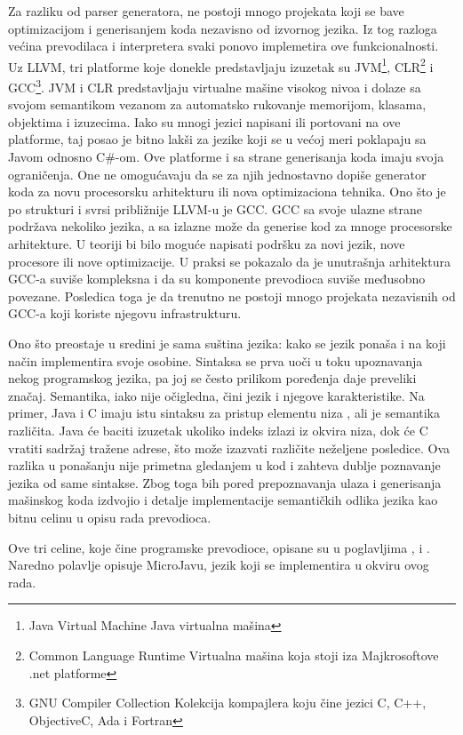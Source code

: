 Za razliku od parser generatora, ne postoji mnogo projekata koji se bave optimizacijom i generisanjem koda nezavisno od izvornog jezika.
Iz tog razloga većina prevodilaca i interpretera svaki ponovo implemetira ove funkcionalnosti. 
Uz LLVM, tri platforme koje donekle predstavljaju izuzetak su 
JVM\footnote{\skr \eng Java Virtual Machine \ndash Java virtualna mašina}, 
CLR\footnote{\skr \eng Common Language Runtime \ndash Virtualna mašina koja stoji iza Majkrosoftove .net platforme} 
i GCC\footnote{\skr \eng GNU Compiler Collection \ndash Kolekcija kompajlera koju čine jezici C, C++, ObjectiveC, Ada i Fortran}. 
JVM i CLR predstavljaju virtualne mašine visokog nivoa i dolaze sa svojom semantikom vezanom za automatsko rukovanje memorijom, klasama, objektima i izuzecima. 
Iako su mnogi jezici napisani ili portovani na ove platforme, taj posao je bitno lakši za jezike koji se u većoj meri poklapaju sa Javom odnosno C\#-om. 
Ove platforme i sa strane generisanja koda imaju svoja ograničenja.
One ne omogućavaju da se za njih jednostavno dopiše generator koda za novu procesorsku arhitekturu ili nova optimizaciona tehnika. 
Ono što je po strukturi i svrsi približnije LLVM-u je GCC.
GCC sa svoje ulazne strane podržava nekoliko jezika, a sa izlazne može da generise kod za mnoge procesorske arhitekture.
U teoriji bi bilo moguće napisati podršku za novi jezik, nove procesore ili nove optimizacije.
U praksi se pokazalo da je unutrašnja arhitektura GCC-a suviše kompleksna i da su komponente prevodioca suviše međusobno povezane. 
Posledica toga je da trenutno ne postoji mnogo projekata nezavisnih od GCC-a koji koriste njegovu infrastrukturu.

Ono što preostaje u sredini je sama suština jezika: kako se jezik ponaša i na koji način implementira svoje osobine.
Sintaksa se prva uoči u toku upoznavanja nekog programskog jezika, pa joj se često prilikom poređenja daje preveliki značaj.
Semantika, iako nije očigledna, čini jezik i njegove karakteristike.
Na primer, Java i C imaju istu sintaksu za pristup elementu niza \ndash {}, ali je semantika različita.
Java će baciti izuzetak ukoliko indeks izlazi iz okvira niza, dok će C vratiti sadržaj tražene adrese, što može izazvati različite neželjene posledice.
Ova razlika u ponašanju nije primetna gledanjem u kod i zahteva dublje poznavanje jezika od same sintakse.
Zbog toga bih pored prepoznavanja ulaza i generisanja mašinskog koda izdvojio i detalje implementacije semantičkih odlika jezika kao bitnu celinu u opisu rada prevodioca.

Ove tri celine, koje čine programske prevodioce, opisane su u poglavljima ,  i .
Naredno polavlje opisuje MicroJavu, jezik koji se implementira u okviru ovog rada.
